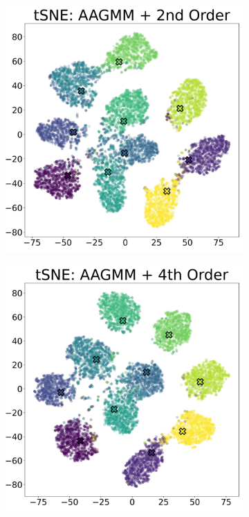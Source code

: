 \documentclass[10pt,twocolumn,letterpaper]{article}
\begin{document}
\begin{figure}[ht]
\begin{subfigure}[t]{.24\textwidth}
		\subcaption{}
	\end{subfigure}
	\begin{subfigure}[t]{.24\textwidth}
		\includegraphics[width=\textwidth]{figures/id-00000054-tsne.jpg}
		\subcaption{}
	\end{subfigure}
	\begin{subfigure}[t]{.24\textwidth}
		\includegraphics[width=\textwidth]{figures/id-00000021-tsne.jpg}

\end{subfigure}
\end{figure}
\end{document}
